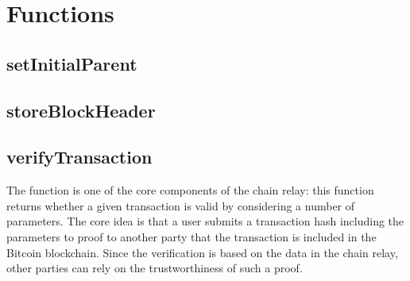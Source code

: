 \documentclass[letterpaper,10pt,english]{sphinxmanual}
\begin{document}
\chapter{Functions}
\label{\detokenize{functions:functions}}\label{\detokenize{functions::doc}}

\section{setInitialParent}
\label{\detokenize{functions:setinitialparent}}

\section{storeBlockHeader}
\label{\detokenize{functions:storeblockheader}}

\section{verifyTransaction}
\label{\detokenize{functions:verifytransaction}}
The  function is one of the core components of the chain relay:
this function returns whether a given transaction is valid by considering a number of parameters.
The core idea is that a user submits a transaction hash including the parameters to proof to another party that  the transaction is included in the Bitcoin blockchain.
Since the verification is based on the data in the chain relay, other parties can rely on the trustworthiness of such a proof.
\end{document}
